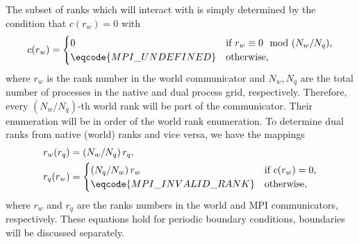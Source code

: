 The subset of ranks which will interact with \quda is simply determined by the condition that $c(r_w)=0$ with
\begin{equation} \label{eq:dual:rank:condition:periodic}
c(r_w) = \begin{cases}
  0                       & \text{if $r_w \equiv 0 \mod (N_w / N_q)$,} \\
  \eqcode{MPI\_UNDEFINED}   & \text{otherwise},
\end{cases}
\end{equation}
where $r_w$ is the rank number in the world communicator and $N_w, N_q$ are the total number of processes in the native and dual process grid, respectively.
Therefore, every $(N_w/N_q)$-th world rank will be part of the \quda communicator.
Their enumeration will be in order of the world rank enumeration.
To determine dual ranks from native (world) ranks and vice versa, we have the mappings
\begin{align}
r_w(r_q) &= \left( N_w / N_q \right) r_q, \label{eq:dual:rank:d2n:mapping:periodic} \\
r_q(r_w) &= 
\begin{cases}
  \left( N_q / N_w \right) r_w    & \text{if $c(r_w)=0$,} \\
  \eqcode{MPI\_INVALID\_RANK}       & \text{otherwise},
\end{cases} \label{eq:dual:rank:n2d:mapping:periodic}
\end{align}
where $r_w$ and $r_q$ are the ranks numbers in the world and \quda MPI communicators, respectively.
These equations hold for periodic boundary conditions, \Cstar boundaries will be discussed separately.

